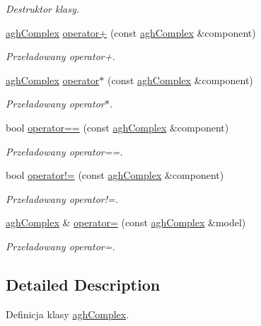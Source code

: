 \begin{DoxyCompactItemize}
\begin{DoxyCompactList}\small\item\em \-Destruktor klasy. \end{DoxyCompactList}\item 
\hyperlink{classaghComplex}{agh\-Complex} \hyperlink{classaghComplex_a2947eef85836d9ae25ad4f14ce339b19}{operator+} (const \hyperlink{classaghComplex}{agh\-Complex} \&component)
\begin{DoxyCompactList}\small\item\em \-Przeładowany operator+. \end{DoxyCompactList}\item 
\hyperlink{classaghComplex}{agh\-Complex} \hyperlink{classaghComplex_a57d13a82a66132e48978dc9373b5e49c}{operator$\ast$} (const \hyperlink{classaghComplex}{agh\-Complex} \&component)
\begin{DoxyCompactList}\small\item\em \-Przeładowany operator$\ast$. \end{DoxyCompactList}\item 
bool \hyperlink{classaghComplex_afc6b8d47e3c628d6c1839a17ff9fe115}{operator==} (const \hyperlink{classaghComplex}{agh\-Complex} \&component)
\begin{DoxyCompactList}\small\item\em \-Przeładowany operator==. \end{DoxyCompactList}\item 
bool \hyperlink{classaghComplex_ad04a2a3511269aed5610537c2caec8e2}{operator!=} (const \hyperlink{classaghComplex}{agh\-Complex} \&component)
\begin{DoxyCompactList}\small\item\em \-Przeładowany operator!=. \end{DoxyCompactList}\item 
\hyperlink{classaghComplex}{agh\-Complex} \& \hyperlink{classaghComplex_a48505ee957fb4bb219e7909b8e99f5e8}{operator=} (const \hyperlink{classaghComplex}{agh\-Complex} \&model)
\begin{DoxyCompactList}\small\item\em \-Przeładowany operator=. \end{DoxyCompactList}\end{DoxyCompactItemize}


\subsection{\-Detailed \-Description}
\-Definicja klasy \hyperlink{classaghComplex}{agh\-Complex}. 

